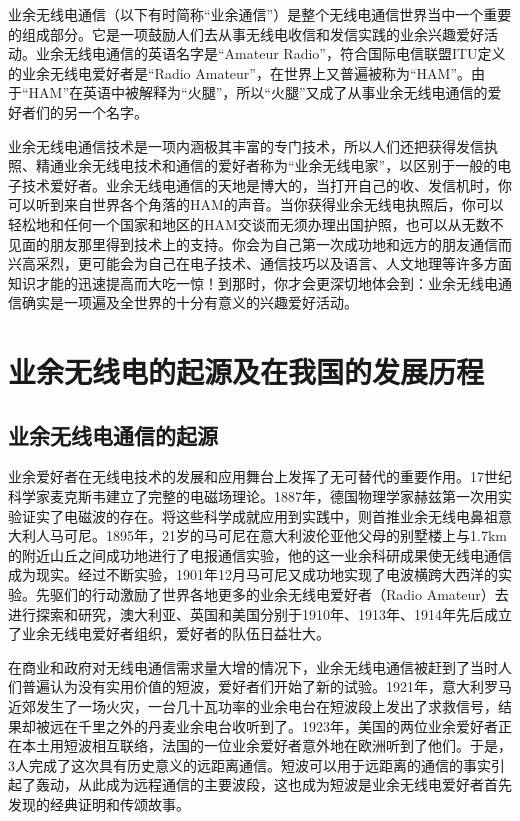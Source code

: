 \documentclass[12pt,UTF8]{ctexbook}
\begin{document}
业余无线电通信（以下有时简称“业余通信”）是整个无线电通信世界当中一个重要的组成部分。它是一项鼓励人们去从事无线电收信和发信实践的业余兴趣爱好活动。业余无线电通信的英语名字是“Amateur Radio”，符合国际电信联盟ITU定义的业余无线电爱好者是“Radio Amateur”，在世界上又普遍被称为“HAM”。由于“HAM”在英语中被解释为“火腿”，所以“火腿”又成了从事业余无线电通信的爱好者们的另一个名字。

业余无线电通信技术是一项内涵极其丰富的专门技术，所以人们还把获得发信执照、精通业余无线电技术和通信的爱好者称为“业余无线电家”，以区别于一般的电子技术爱好者。业余无线电通信的天地是博大的，当打开自己的收、发信机时，你可以听到来自世界各个角落的HAM的声音。当你获得业余无线电执照后，你可以轻松地和任何一个国家和地区的HAM交谈而无须办理出国护照，也可以从无数不见面的朋友那里得到技术上的支持。你会为自己第一次成功地和远方的朋友通信而兴高采烈，更可能会为自己在电子技术、通信技巧以及语言、人文地理等许多方面知识才能的迅速提高而大吃一惊！到那时，你才会更深切地体会到：业余无线电通信确实是一项遍及全世界的十分有意义的兴趣爱好活动。

\chapter{业余无线电的起源及在我国的发展历程}

\section{业余无线电通信的起源}

业余爱好者在无线电技术的发展和应用舞台上发挥了无可替代的重要作用。17世纪科学家麦克斯韦建立了完整的电磁场理论。1887年，德国物理学家赫兹第一次用实验证实了电磁波的存在。将这些科学成就应用到实践中，则首推业余无线电鼻祖意大利人马可尼。1895年，21岁的马可尼在意大利波伦亚他父母的别墅楼上与1.7km的附近山丘之间成功地进行了电报通信实验，他的这一业余科研成果使无线电通信成为现实。经过不断实验，1901年12月马可尼又成功地实现了电波横跨大西洋的实验。先驱们的行动激励了世界各地更多的业余无线电爱好者（Radio Amateur）去进行探索和研究，澳大利亚、英国和美国分别于1910年、1913年、1914年先后成立了业余无线电爱好者组织，爱好者的队伍日益壮大。

在商业和政府对无线电通信需求量大增的情况下，业余无线电通信被赶到了当时人们普遍认为没有实用价值的短波，爱好者们开始了新的试验。1921年，意大利罗马近郊发生了一场火灾，一台几十瓦功率的业余电台在短波段上发出了求救信号，结果却被远在千里之外的丹麦业余电台收听到了。1923年，美国的两位业余爱好者正在本土用短波相互联络，法国的一位业余爱好者意外地在欧洲听到了他们。于是，3人完成了这次具有历史意义的远距离通信。短波可以用于远距离的通信的事实引起了轰动，从此成为远程通信的主要波段，这也成为短波是业余无线电爱好者首先发现的经典证明和传颂故事。
\end{document}

